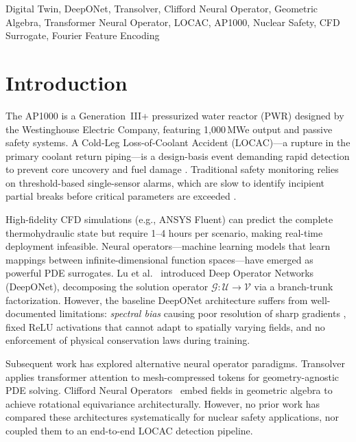 \documentclass[conference]{IEEEtran}
\begin{document}
\begin{IEEEkeywords}
Digital Twin, DeepONet, Transolver, Clifford Neural Operator, Geometric Algebra, Transformer Neural Operator, LOCAC, AP1000, Nuclear Safety, CFD Surrogate, Fourier Feature Encoding
\end{IEEEkeywords}

\section{Introduction}

The AP1000 is a Generation~III+ pressurized water reactor (PWR) designed by the Westinghouse Electric Company, featuring 1,000\,MWe output and passive safety systems. A Cold-Leg Loss-of-Coolant Accident (LOCAC)---a rupture in the primary coolant return piping---is a design-basis event demanding rapid detection to prevent core uncovery and fuel damage \cite{wecdcd}. Traditional safety monitoring relies on threshold-based single-sensor alarms, which are slow to identify incipient partial breaks before critical parameters are exceeded \cite{nrc_loca}.

High-fidelity CFD simulations (e.g., ANSYS Fluent) can predict the complete thermohydraulic state but require 1--4 hours per scenario, making real-time deployment infeasible. Neural operators---machine learning models that learn mappings between infinite-dimensional function spaces---have emerged as powerful PDE surrogates. Lu et al.~\cite{lu2021deeponet} introduced Deep Operator Networks (DeepONet), decomposing the solution operator $\mathcal{G}: \mathcal{U} \to \mathcal{V}$ via a branch-trunk factorization. However, the baseline DeepONet architecture suffers from well-documented limitations: \emph{spectral bias} causing poor resolution of sharp gradients \cite{rahaman2019spectral}, fixed ReLU activations that cannot adapt to spatially varying fields, and no enforcement of physical conservation laws during training.

Subsequent work has explored alternative neural operator paradigms. Transolver~\cite{wu2024transolver} applies transformer attention to mesh-compressed tokens for geometry-agnostic PDE solving. Clifford Neural Operators~\cite{brandstetter2023clifford} embed fields in geometric algebra to achieve rotational equivariance architecturally. However, no prior work has compared these architectures systematically for nuclear safety applications, nor coupled them to an end-to-end LOCAC detection pipeline.
\end{document}
